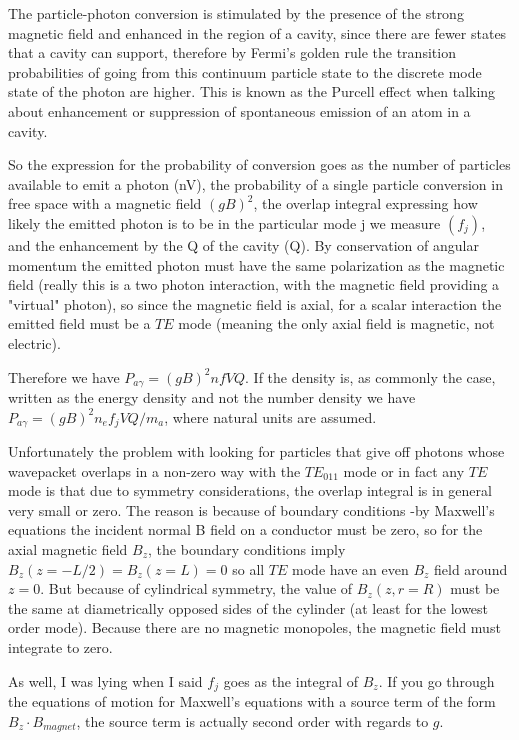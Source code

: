 \documentclass[11pt]{article}
\begin{document}
The particle-photon conversion is stimulated by the presence of the strong magnetic field and enhanced in the region of a cavity, since there are fewer states that a cavity can support, therefore by Fermi's golden rule the transition probabilities of going from this continuum particle state to the discrete mode state of the photon are higher. This is known as the Purcell effect when talking about enhancement or suppression of spontaneous emission of an atom in a cavity.

So the expression for the probability of conversion goes as the number of particles available to emit a photon (nV), the probability of a single particle conversion in free space with a magnetic field $(gB)^2$, the overlap integral expressing how likely the emitted photon is to be in the particular mode j we measure $(f_{j})$, and the enhancement by the Q of the cavity (Q). By conservation of angular momentum the emitted photon must have the same polarization as the magnetic field (really this is a two photon interaction, with the magnetic field providing a "virtual" photon), so since the magnetic field is axial, for a scalar interaction the emitted field must be a $TE$ mode (meaning the only axial field is magnetic, not electric).

Therefore we have $P_{a\gamma} = (gB)^2 nfVQ.$ If the density is, as commonly the case, written as the energy density and not the number density we have $P_{a\gamma} = (gB)^2 n_e f_{j} VQ/m_a$, where natural units are assumed.

Unfortunately the problem with looking for particles that give off photons whose wavepacket overlaps in a non-zero way with the $TE_{011}$ mode or in fact any $TE$ mode is that due to symmetry considerations, the overlap integral is in general very small or zero. The reason is because of boundary conditions -by Maxwell's equations the incident normal B field on a conductor must be zero, so for the axial magnetic field $B_z$, the boundary conditions imply $B_z(z=-L/2)=B_z(z=L) = 0$ so all $TE$ mode have an even $B_z$ field around $z=0$. But because of cylindrical symmetry, the value of $B_z(z,r=R)$ must be the same at diametrically opposed sides of the cylinder (at least for the lowest order mode). Because there are no magnetic monopoles, the magnetic field must integrate to zero. 

As well, I was lying when I said $f_j$ goes as the integral of $B_z$. If you go through the equations of motion for Maxwell's equations with a source term of the form $B_z\cdot B_{magnet}$, the source term is actually second order with regards to $g$.
\end{document}
